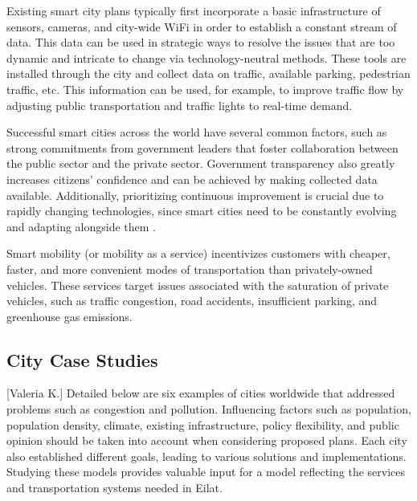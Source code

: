 \documentclass[12pt]{article}                       %
\begin{document}
Existing smart city plans typically first incorporate a basic infrastructure of sensors, cameras, and city-wide WiFi in order to establish a constant stream of data. This data can be used in strategic ways to resolve the issues that are too dynamic and intricate to change via technology-neutral methods. These tools are installed through the city and collect data on traffic, available parking, pedestrian traffic, etc. This information can be used, for example, to improve traffic flow by adjusting public transportation and traffic lights to real-time demand.

Successful smart cities across the world have several common factors, such as strong commitments from government leaders that foster collaboration between the public sector and the private sector. Government transparency also greatly increases citizens' confidence and can be achieved by making collected data available. Additionally, prioritizing continuous improvement is crucial due to rapidly changing technologies, since smart cities need to be constantly evolving and adapting alongside them \cite{Zanghi2017WhyExamples}. 

Smart mobility (or mobility as a service) incentivizes customers with cheaper, faster, and more convenient modes of transportation than privately-owned vehicles. These services target issues associated with the saturation of private vehicles, such as traffic congestion, road accidents, insufficient parking, and greenhouse gas emissions.

\subsection{City Case Studies}[Valeria K.]
Detailed below are six examples of cities worldwide that addressed problems such as congestion and pollution. Influencing factors such as population, population density, climate, existing infrastructure, policy flexibility, and public opinion should be taken into account when considering proposed plans. Each city also established different goals, leading to various solutions and implementations. Studying these models provides valuable input for a model reflecting the services and transportation systems needed in Eilat.
\end{document}
